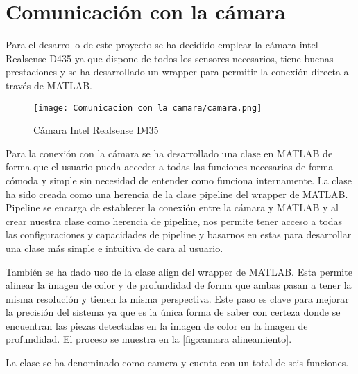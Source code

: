 \chapter{Comunicación con la cámara}
\label{chap:Comunicacion con la camara}
Para el desarrollo de este proyecto se ha decidido emplear la cámara intel Realsense D435 \citep{IntelD435} ya que dispone de todos los sensores necesarios, tiene buenas prestaciones y se ha desarrollado un wrapper para permitir la conexión directa a través de MATLAB.

\begin{figure}[ht]  %
	\centering
	\texttt{[image: Comunicacion con la camara/camara.png]}
	\caption[Cámara Intel Realsense D435]{Cámara Intel Realsense D435 \citep{IntelD435}}
	\label{fig:camara}
\end{figure}

Para la conexión con la cámara se ha desarrollado una clase en MATLAB de forma que el usuario pueda acceder a todas las funciones necesarias de forma cómoda y simple sin necesidad de entender como funciona internamente. La clase ha sido creada como una herencia de la clase pipeline del wrapper de MATLAB. Pipeline se encarga de establecer la conexión entre la cámara y MATLAB y al crear nuestra clase como herencia de pipeline, nos permite tener acceso a todas las configuraciones y capacidades de pipeline y basarnos en estas para desarrollar una clase más simple e intuitiva de cara al usuario.

También se ha dado uso de la clase align del wrapper de MATLAB. Esta permite alinear la imagen de color y de profundidad de forma que ambas pasan a tener la misma resolución y tienen la misma perspectiva. Este paso es clave para mejorar la precisión del sistema ya que es la única forma de saber con certeza donde se encuentran las piezas detectadas en la imagen de color en la imagen de profundidad. El proceso se muestra en la \autoref{fig:camara alineamiento}.

La clase se ha denominado como camera y cuenta con un total de seis funciones.

